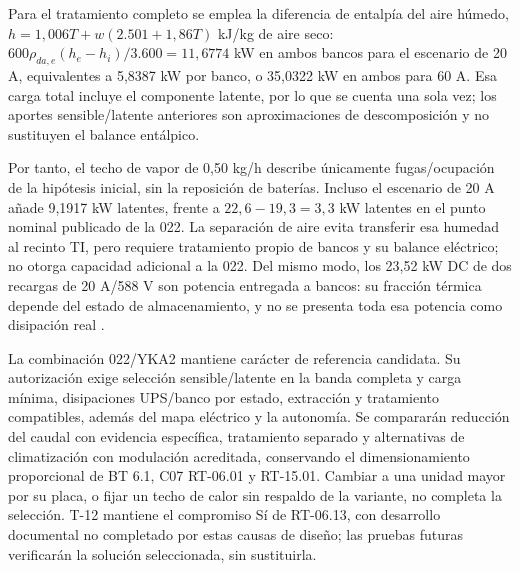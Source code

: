 Para el tratamiento completo se emplea la diferencia de entalpía del aire húmedo, $h=1,006T+w(2.501+1,86T)$ kJ/kg de aire seco: $600\rho_{da,e}(h_e-h_i)/3.600=11,6774$ kW en ambos bancos para el escenario de 20 A, equivalentes a 5,8387 kW por banco, o 35,0322 kW en ambos para 60 A. Esa carga total incluye el componente latente, por lo que se cuenta una sola vez; los aportes sensible/latente anteriores son aproximaciones de descomposición y no sustituyen el balance entálpico.

Por tanto, el techo de vapor de 0,50 kg/h describe únicamente fugas/ocupación de la hipótesis inicial, sin la reposición de baterías. Incluso el escenario de 20 A añade 9,1917 kW latentes, frente a $22,6-19,3=3,3$ kW latentes en el punto nominal publicado de la 022. La separación de aire evita transferir esa humedad al recinto TI, pero requiere tratamiento propio de bancos y su balance eléctrico; no otorga capacidad adicional a la 022. Del mismo modo, los 23,52 kW DC de dos recargas de 20 A/588 V son potencia entregada a bancos: su fracción térmica depende del estado de almacenamiento, y no se presenta toda esa potencia como disipación real \parencite[p.~3]{p6-mext-pi-2025}.

La combinación 022/YKA2 mantiene carácter de referencia candidata. Su autorización exige selección sensible/latente en la banda completa y carga mínima, disipaciones UPS/banco por estado, extracción y tratamiento compatibles, además del mapa eléctrico y la autonomía. Se compararán reducción del caudal con evidencia específica, tratamiento separado y alternativas de climatización con modulación acreditada, conservando el dimensionamiento proporcional de BT 6.1, C07 RT-06.01 y RT-15.01. Cambiar a una unidad mayor por su placa, o fijar un techo de calor sin respaldo de la variante, no completa la selección. T-12 mantiene el compromiso Sí de RT-06.13, con desarrollo documental no completado por estas causas de diseño; las pruebas futuras verificarán la solución seleccionada, sin sustituirla.
